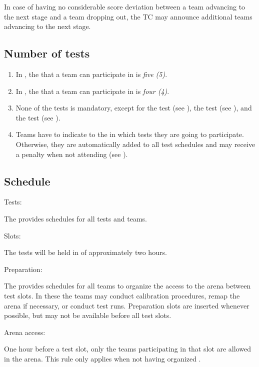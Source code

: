 In case of having no considerable score deviation between a team advancing to the next stage and a team dropping out, the TC may announce additional teams advancing to the next stage.


\subsection{Number of tests}\label{rule:number_of_tests}

\begin{enumerate}
	\item In , the  that a team can participate in is \emph{five (5)}.
	\item In , the  that a team can participate in is \emph{four (4)}.
	\item None of the tests is mandatory, except for the  test (see ), the  test (see ), and the  test (see ).
	\item Teams have to indicate to the  in which tests they are going to participate. Otherwise, they are automatically added to all test schedules and may receive a penalty when not attending (see ).
\end{enumerate}


\subsection{Schedule}
\label{rule:schedule}

\begin{enumerate}
	{\bf\item Tests:} The  provides schedules for all tests and teams. 
	{\bf\item Slots:} The tests will be held in  of approximately two hours.
	{\bf\item Preparation:} The  provides schedules for all teams to organize the access to the arena between test slots. In these  the teams may conduct calibration procedures, remap the arena if necessary, or conduct test runs.
	Preparation slots are inserted whenever possible, but may not be available before all test slots. 
	{\bf\item Arena access:} One hour before a test slot, only the teams participating in that slot are allowed in the arena.
This rule only applies when not having organized .   
\end{enumerate}


